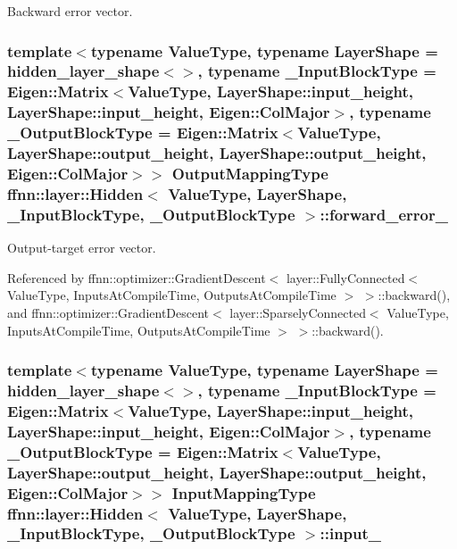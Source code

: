 Backward error vector. 

\hypertarget{classffnn_1_1layer_1_1_hidden_af1f439bdd3645a5ee444455d822b5143}{
\subsubsection[{forward\-\_\-error\-\_\-}]{\setlength{\rightskip}{0pt plus 5cm}template$<$typename Value\-Type, typename Layer\-Shape = hidden\-\_\-layer\-\_\-shape$<$$>$, typename \-\_\-\-Input\-Block\-Type = Eigen\-::\-Matrix$<$\-Value\-Type, Layer\-Shape\-::input\-\_\-height, Layer\-Shape\-::input\-\_\-height, Eigen\-::\-Col\-Major$>$, typename \-\_\-\-Output\-Block\-Type = Eigen\-::\-Matrix$<$\-Value\-Type, Layer\-Shape\-::output\-\_\-height, Layer\-Shape\-::output\-\_\-height, Eigen\-::\-Col\-Major$>$$>$ {\bf Output\-Mapping\-Type} {\bf ffnn\-::layer\-::\-Hidden}$<$ Value\-Type, Layer\-Shape, \-\_\-\-Input\-Block\-Type, \-\_\-\-Output\-Block\-Type $>$\-::forward\-\_\-error\-\_\-\hspace{0.3cm}{\ttfamily [protected]}}}\label{classffnn_1_1layer_1_1_hidden_af1f439bdd3645a5ee444455d822b5143}


Output-\/target error vector. 



Referenced by ffnn\-::optimizer\-::\-Gradient\-Descent$<$ layer\-::\-Fully\-Connected$<$ Value\-Type, Inputs\-At\-Compile\-Time, Outputs\-At\-Compile\-Time $>$ $>$\-::backward(), and ffnn\-::optimizer\-::\-Gradient\-Descent$<$ layer\-::\-Sparsely\-Connected$<$ Value\-Type, Inputs\-At\-Compile\-Time, Outputs\-At\-Compile\-Time $>$ $>$\-::backward().

\hypertarget{classffnn_1_1layer_1_1_hidden_a1177e86b75ad7ba87aa4e855defa5851}{
\subsubsection[{input\-\_\-}]{\setlength{\rightskip}{0pt plus 5cm}template$<$typename Value\-Type, typename Layer\-Shape = hidden\-\_\-layer\-\_\-shape$<$$>$, typename \-\_\-\-Input\-Block\-Type = Eigen\-::\-Matrix$<$\-Value\-Type, Layer\-Shape\-::input\-\_\-height, Layer\-Shape\-::input\-\_\-height, Eigen\-::\-Col\-Major$>$, typename \-\_\-\-Output\-Block\-Type = Eigen\-::\-Matrix$<$\-Value\-Type, Layer\-Shape\-::output\-\_\-height, Layer\-Shape\-::output\-\_\-height, Eigen\-::\-Col\-Major$>$$>$ {\bf Input\-Mapping\-Type} {\bf ffnn\-::layer\-::\-Hidden}$<$ Value\-Type, Layer\-Shape, \-\_\-\-Input\-Block\-Type, \-\_\-\-Output\-Block\-Type $>$\-::input\-\_\-\hspace{0.3cm}{\ttfamily [protected]}}}\label{classffnn_1_1layer_1_1_hidden_a1177e86b75ad7ba87aa4e855defa5851}


